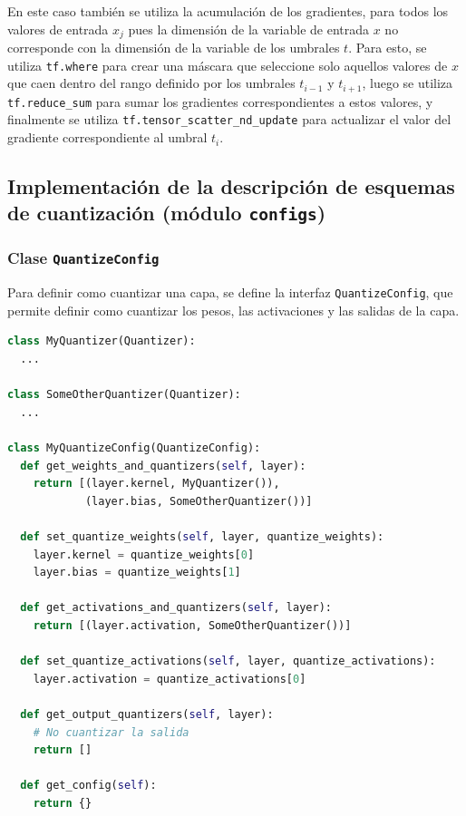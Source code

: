 En este caso también se utiliza la acumulación de los gradientes, para todos los valores de entrada $x_j$ pues la dimensión de la variable de entrada $x$ no corresponde con la dimensión de la variable de los umbrales $t$. Para esto, se utiliza \texttt{tf.where} para crear una máscara que seleccione solo aquellos valores de $x$ que caen dentro del rango definido por los umbrales $t_{i-1}$ y $t_{i+1}$, luego se utiliza \texttt{tf.reduce\_sum} para sumar los gradientes correspondientes a estos valores, y finalmente se utiliza \texttt{tf.tensor\_scatter\_nd\_update} para actualizar el valor del gradiente correspondiente al umbral $t_i$.


\subsection{Implementación de la descripción de esquemas de cuantización (módulo \texttt{configs})}

\subsubsection{Clase \texttt{QuantizeConfig}}

Para definir como cuantizar una capa, se define la interfaz \texttt{QuantizeConfig}, que permite definir como cuantizar los pesos, las activaciones y las salidas de la capa.

\begin{lstlisting}[language=Python,label=code:quantize_config,caption=Interfaz QuantizeConfig de TFMOT.]
class MyQuantizer(Quantizer):
  ...

class SomeOtherQuantizer(Quantizer):
  ...

class MyQuantizeConfig(QuantizeConfig):
  def get_weights_and_quantizers(self, layer):
    return [(layer.kernel, MyQuantizer()),
            (layer.bias, SomeOtherQuantizer())]

  def set_quantize_weights(self, layer, quantize_weights):
    layer.kernel = quantize_weights[0]
    layer.bias = quantize_weights[1]

  def get_activations_and_quantizers(self, layer):
    return [(layer.activation, SomeOtherQuantizer())]

  def set_quantize_activations(self, layer, quantize_activations):
    layer.activation = quantize_activations[0]

  def get_output_quantizers(self, layer):
    # No cuantizar la salida
    return []

  def get_config(self):
    return {}

\end{lstlisting}

